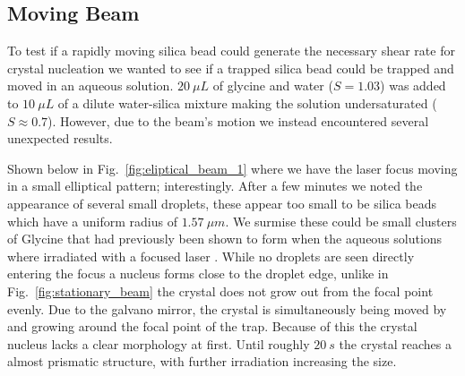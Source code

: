 \subsection{Moving Beam}
\label{sec:stationary}
To test if a rapidly moving silica bead could generate the necessary shear rate 
for crystal nucleation we wanted to see if a trapped silica bead could be trapped
and moved in an aqueous solution. $20\ \mu L$ of glycine and water ($S=1.03$) was added to $10\ \mu L$ of a dilute water-silica mixture making the solution undersaturated ($S\approx0.7$). However, due to the beam's motion we instead 
encountered several unexpected results. 

Shown below in Fig.~\ref{fig:eliptical_beam_1} where we have the laser focus 
moving in a small elliptical pattern; interestingly. After a few minutes we 
noted the appearance of several small droplets, these appear too small to be 
silica beads which have a uniform radius of $1.57\ \mu m$. We surmise these 
could be small clusters of Glycine that had previously been shown to form 
when the aqueous solutions where irradiated with a focused laser \cite{Tsuboi2009,
Gowayed2021}. While no droplets are seen directly entering the focus a nucleus 
forms close to the droplet edge, unlike in Fig.~\ref{fig:stationary_beam} the 
crystal does not grow out from the focal point evenly. Due to the galvano mirror, 
the crystal is simultaneously being moved by and growing around the focal point 
of the trap. Because of this the crystal nucleus lacks a clear morphology at 
first. Until roughly $20\ s$ the crystal reaches a almost prismatic structure, 
with further irradiation increasing the size.
 
